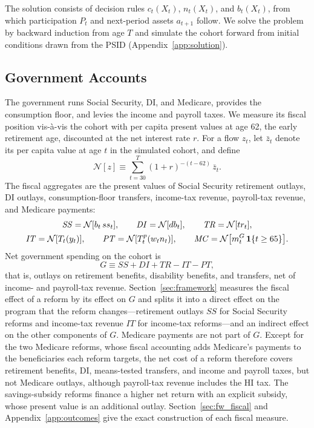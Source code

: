 The solution consists of decision rules $c_t(X_t)$, $n_t(X_t)$, and $b_t(X_t)$, from which participation $P_t$ and next-period assets $a_{t+1}$ follow. We solve the problem by backward induction from age $T$ and simulate the cohort forward from initial conditions drawn from the PSID (Appendix~\ref{app:solution}).

\subsection{Government Accounts}\label{sec:model_gov}

The government runs Social Security, DI, and Medicare, provides the consumption floor, and levies the income and payroll taxes. We measure its fiscal position vis-\`a-vis the cohort with per capita present values at age 62, the early retirement age, discounted at the net interest rate $r$. For a flow $z_t$, let $\bar{z}_t$ denote its per capita value at age $t$ in the simulated cohort, and define
\begin{equation*}
\mathcal{N}[z]\equiv\sum_{t=30}^{T}(1+r)^{-(t-62)}\,\bar{z}_t .
\end{equation*}
The fiscal aggregates are the present values of Social Security retirement outlays, DI outlays, consumption-floor transfers, income-tax revenue, payroll-tax revenue, and Medicare payments:
\begin{gather*}
\mathit{SS}=\mathcal{N}[b_t\,ss_t], \qquad \mathit{DI}=\mathcal{N}[db_t], \qquad \mathit{TR}=\mathcal{N}[tr_t],\\
\mathit{IT}=\mathcal{N}[T_t(y_t)], \qquad \mathit{PT}=\mathcal{N}[T^p_t(w_t n_t)], \qquad \mathit{MC}=\mathcal{N}\big[m^G_t\,\mathbf{1}\{t\geq 65\}\big].
\end{gather*}
Net government spending on the cohort is
\begin{equation*}
G\equiv \mathit{SS}+\mathit{DI}+\mathit{TR}-\mathit{IT}-\mathit{PT},
\end{equation*}
that is, outlays on retirement benefits, disability benefits, and transfers, net of income- and payroll-tax revenue. Section~\ref{sec:framework} measures the fiscal effect of a reform by its effect on $G$ and splits it into a direct effect on the program that the reform changes---retirement outlays $\mathit{SS}$ for Social Security reforms and income-tax revenue $\mathit{IT}$ for income-tax reforms---and an indirect effect on the other components of $G$. Medicare payments are not part of $G$. Except for the two Medicare reforms, whose fiscal accounting adds Medicare's payments to the beneficiaries each reform targets, the net cost of a reform therefore covers retirement benefits, DI, means-tested transfers, and income and payroll taxes, but not Medicare outlays, although payroll-tax revenue includes the HI tax. The savings-subsidy reforms finance a higher net return with an explicit subsidy, whose present value is an additional outlay. Section~\ref{sec:fw_fiscal} and Appendix~\ref{app:outcomes} give the exact construction of each fiscal measure.


